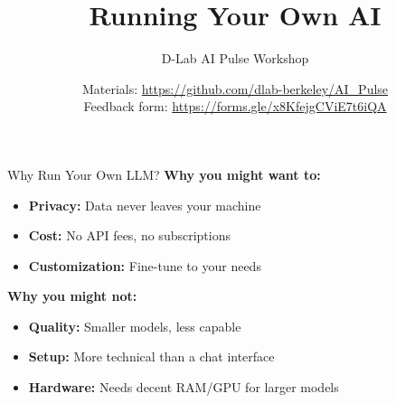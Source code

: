 \documentclass[aspectratio=169]{beamer}
\title{Running Your Own AI}
\subtitle{D-Lab AI Pulse Workshop}
\author[D-Lab]{Materials: \url{https://github.com/dlab-berkeley/AI_Pulse}\\Feedback form: \url{https://forms.gle/x8KfejgCViE7t6iQA}}
\date{}
\begin{document}
\begin{frame}[plain]
    \titlepage
\end{frame}


\begin{frame}{Why Run Your Own LLM?}
    \textbf{Why you might want to:}
    \begin{itemize}
        \vspace{0.3em}
        \item \textbf{Privacy:} Data never leaves your machine
        \vspace{0.3em}
        \item \textbf{Cost:} No API fees, no subscriptions
        \vspace{0.3em}
        \item \textbf{Customization:} Fine-tune to your needs
    \end{itemize}

    \vspace{0.8em}
    \textbf{Why you might not:}
    \begin{itemize}
        \vspace{0.3em}
        \item \textbf{Quality:} Smaller models, less capable
        \vspace{0.3em}
        \item \textbf{Setup:} More technical than a chat interface
        \vspace{0.3em}
        \item \textbf{Hardware:} Needs decent RAM/GPU for larger models
    \end{itemize}
\end{frame}
\end{document}
